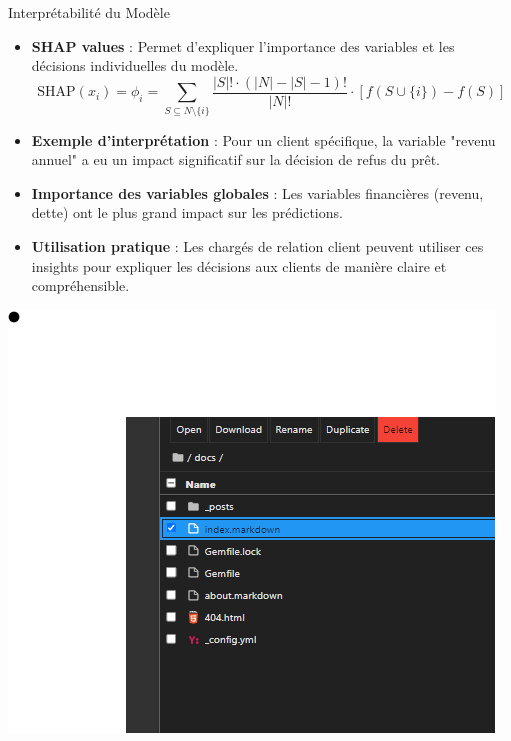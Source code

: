 \documentclass{beamer}
\begin{document}
\begin{frame}{Interprétabilité du Modèle}
    \begin{itemize}
        \item \textbf{SHAP values} : Permet d'expliquer l'importance des variables et les décisions individuelles du modèle.
        \[
        \text{SHAP}(x_i) = \phi_i = \sum_{S \subseteq N \setminus \{i\}} \frac{|S|! \cdot (|N|-|S|-1)!}{|N|!} \cdot \left[ f(S \cup \{i\}) - f(S) \right]
        \]
        \item \textbf{Exemple d'interprétation} : Pour un client spécifique, la variable "revenu annuel" a eu un impact significatif sur la décision de refus du prêt.
        \item \textbf{Importance des variables globales} : Les variables financières (revenu, dette) ont le plus grand impact sur les prédictions.
        \item \textbf{Utilisation pratique} : Les chargés de relation client peuvent utiliser ces insights pour expliquer les décisions aux clients de manière claire et compréhensible.
    \end{itemize}
    \includegraphics[width=\textwidth]{assets/test.png} %
\end{frame}
\end{document}
